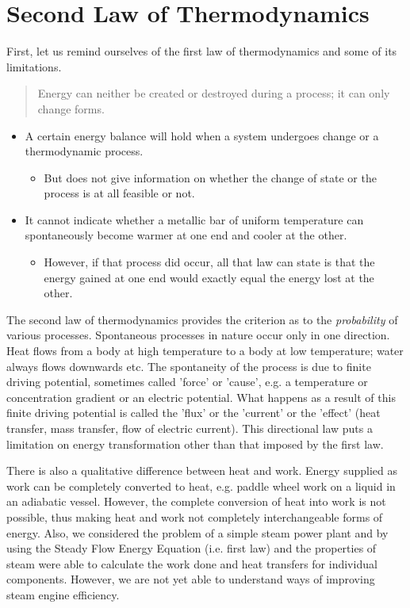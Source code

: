 \documentclass[class=report, crop=false, 12pt,a4paper]{standalone}
\begin{document}
\section{Second Law of Thermodynamics}
First, let us remind ourselves of the first law of thermodynamics and some of its limitations. 
\begin{quote}
  \begin{center}
    Energy can neither be created or destroyed during a process; it can only change forms.
  \end{center}
\end{quote}
\begin{itemize}[noitemsep]
  \item A certain energy balance will hold when a system undergoes change or a thermodynamic process.
  \begin{itemize}
    \item But does not give information on whether the change of state or the process is at all feasible or not.
  \end{itemize}
  \item It cannot indicate whether a metallic bar of uniform temperature can spontaneously become warmer at one end and cooler at the other.
  \begin{itemize}
    \item However, if that process did occur, all that law can state is that the energy gained at one end would exactly equal the energy lost at the other.
  \end{itemize}
\end{itemize}
The second law of thermodynamics provides the criterion as to the \emph{probability} of various processes. Spontaneous processes in nature occur only in one direction. Heat flows from a body at high temperature to a body at low temperature; water always flows downwards etc. The spontaneity of the process is due to finite driving potential, sometimes called 'force' or 'cause', e.g. a temperature or concentration gradient or an electric potential. What happens as a result of this finite driving potential is called the 'flux' or the 'current' or the 'effect' (heat transfer, mass transfer, flow of electric current). This directional law puts a limitation on energy transformation other than that imposed by the first law. 

There is also a qualitative difference between heat and work. Energy supplied as work can be completely converted to heat, e.g. paddle wheel work on a liquid in an adiabatic vessel. However, the complete conversion of heat into work is not possible, thus making heat and work not completely interchangeable forms of energy. Also, we considered the problem of a simple steam power plant and by using the Steady Flow Energy Equation (i.e. first law) and the properties of steam were able to calculate the work done and heat transfers for individual components. However, we are not yet able to understand ways of improving steam engine efficiency.
\end{document}
